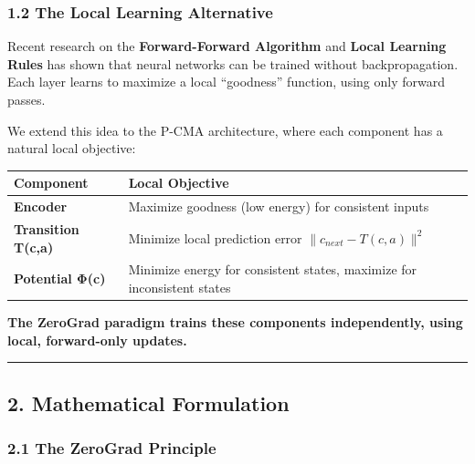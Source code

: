 \documentclass[
  11pt,
  a4paper,
]{article}
\begin{document}
\subsubsection{1.2 The Local Learning
Alternative}\label{the-local-learning-alternative}

Recent research on the \textbf{Forward-Forward Algorithm} and
\textbf{Local Learning Rules} has shown that neural networks can be
trained without backpropagation. Each layer learns to maximize a local
``goodness'' function, using only forward passes.

We extend this idea to the P-CMA architecture, where each component has
a natural local objective:

\begin{longtable}[]{@{}
  >{\raggedright\arraybackslash}p{}
  >{\raggedright\arraybackslash}p{}@{}}
\toprule\noalign{}
\begin{minipage}[b]{\linewidth}\raggedright
Component
\end{minipage} & \begin{minipage}[b]{\linewidth}\raggedright
Local Objective
\end{minipage} \\
\midrule\noalign{}
\endhead
\bottomrule\noalign{}
\endlastfoot
\textbf{Encoder} & Maximize goodness (low energy) for consistent
inputs \\
\textbf{Transition T(c,a)} & Minimize local prediction error
\(\|c_{next} - T(c,a)\|^2\) \\
\textbf{Potential Φ(c)} & Minimize energy for consistent states,
maximize for inconsistent states \\
\end{longtable}

\textbf{The ZeroGrad paradigm trains these components independently,
using local, forward-only updates.}

\begin{center}\rule{0.5\linewidth}{0.5pt}\end{center}

\subsection{2. Mathematical Formulation}\label{mathematical-formulation}

\subsubsection{2.1 The ZeroGrad Principle}\label{the-zerograd-principle}
\end{document}
